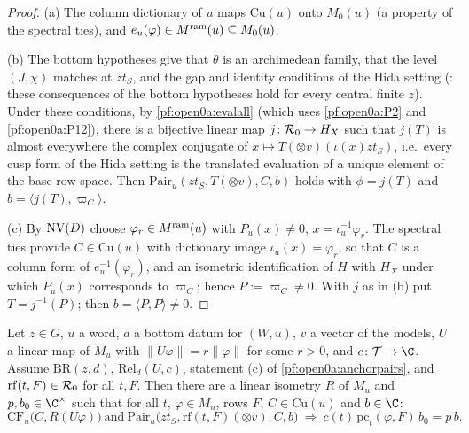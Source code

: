 \begin{proof}
(a) The column dictionary of $u$ maps $\mathrm{Cu}(u)$ onto $M_0(u)$ (a property of the spectral ties), and
$e_u(\varphi)\in M^{\mathrm{ram}}(u)\subseteq M_0(u)$.

(b) The bottom hypotheses give that $\theta$ is an archimedean family, that the level $(J,\chi)$ matches at $zt_S$, and
the gap and identity conditions of the Hida setting (:
these consequences of the bottom hypotheses hold for every central finite $z$). Under these conditions, by
\cref{pf:open0a:evalall} (which uses \ref{pf:open0a:P2} and \ref{pf:open0a:P12}),
there is a bijective linear map $j\colon\mathcal{R}_0\to H_X$ such that $j(T)$ is almost everywhere the complex
conjugate of $x\mapsto T(\otimes v)(\iota(x)zt_S)$, i.e.\ every cusp form of the Hida setting is the translated
evaluation of a unique element of the base row space. Then $\mathrm{Pair}_u(zt_S,T(\otimes v),C,b)$ holds with
$\phi=\overline{j(T)}$ and $b=\langle j(T),\varpi_C\rangle$.

(c) By $\mathrm{NV}(D)$ choose $\varphi_r\in M^{\mathrm{ram}}(u)$ with $P_u(x)\ne0$, $x=\iota_u^{-1}\varphi_r$. The spectral
ties provide $C\in\mathrm{Cu}(u)$ with dictionary image $\iota_u(x)=\varphi_r$, so that $C$ is a column form of
$e_u^{-1}(\varphi_r)$, and an isometric identification of $H$ with $H_X$ under which $P_u(x)$ corresponds to
$\varpi_C$; hence $P:=\varpi_C\ne0$. With $j$ as in (b) put $T=j^{-1}(P)$; then
$b=\langle P,P\rangle\ne0$.
\end{proof}

\begin{lemma}\label{pf:open0a:anchorword}
Let $z\in G$, $u$ a word, $d$ a bottom datum for $(W,u)$, $v$ a vector of the models, $U$ a linear map of $M_u$ with
$\|U\varphi\|=r\|\varphi\|$ for some $r>0$, and $c\colon\mathcal T\to\C$. Assume $\mathrm{BR}(z,d)$,
$\mathrm{Rel}_d(U,c)$, statement (c) of \cref{pf:open0a:anchorpairs}, and $\mathrm{rf}(t,F)\in\mathcal{R}_0$ for all
$t,F$. Then there are a linear isometry $R$ of $M_u$ and $p,b_0\in\C^\times$ such that for all $t$, $\varphi\in M_u$,
rows $F$, $C\in\mathrm{Cu}(u)$ and $b\in\C$:
\[
\mathrm{CF}_u\bigl(C,R(U\varphi)\bigr)\ \text{and}\ \mathrm{Pair}_u\bigl(zt_S,\mathrm{rf}(t,F)(\otimes v),C,b\bigr)
\ \Longrightarrow\ c(t)\,\mathrm{pc}_t(\varphi,F)\,b_0=p\,b.
\]
\end{lemma}

